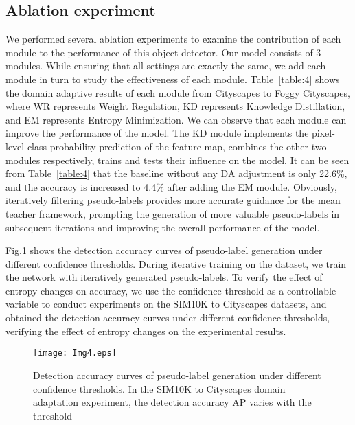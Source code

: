 \documentclass[sn-mathphys]{sn-jnl}%
\theoremstyle{thmstyleone}%
\theoremstyle{thmstyletwo}%
\theoremstyle{thmstylethree}%
\begin{document}
%
%
\subsection{Ablation experiment}
We performed several ablation experiments to examine the contribution of each module to the performance of this object detector. Our model consists of 3 modules. While ensuring that all settings are exactly the same, we add each module in turn to study the effectiveness of each module. Table~\ref{table:4} shows the domain adaptive results of each module from Cityscapes to Foggy Cityscapes, where WR represents Weight Regulation, KD represents Knowledge Distillation, and EM represents Entropy Minimization. We can observe that each module can improve the performance of the model. The KD module implements the pixel-level class probability prediction of the feature map, combines the other two modules respectively, trains and tests their influence on the model. It can be seen from Table~\ref{table:4} that the baseline without any DA adjustment is only 22.6\%, and the accuracy is increased to 4.4\% after adding the EM module. Obviously, iteratively filtering pseudo-labels provides more accurate guidance for the mean teacher framework, prompting the generation of more valuable pseudo-labels in subsequent iterations and improving the overall performance of the model.


Fig.\ref{fig4} shows the detection accuracy curves of pseudo-label generation under different confidence thresholds. During iterative training on the dataset, we train the network with iteratively generated pseudo-labels. To verify the effect of entropy changes on accuracy, we use the confidence threshold as a controllable variable to conduct experiments on the SIM10K to Cityscapes datasets, and obtained the detection accuracy curves under different confidence thresholds, verifying the effect of entropy changes on the experimental results.
\begin{figure}
	\centering	
	\texttt{[image: Img4.eps]}
	\caption{Detection accuracy curves of pseudo-label generation under different confidence thresholds. In the SIM10K to Cityscapes domain adaptation experiment, the detection accuracy AP varies with the threshold} \label{fig4}
\end{figure}
\end{document}
